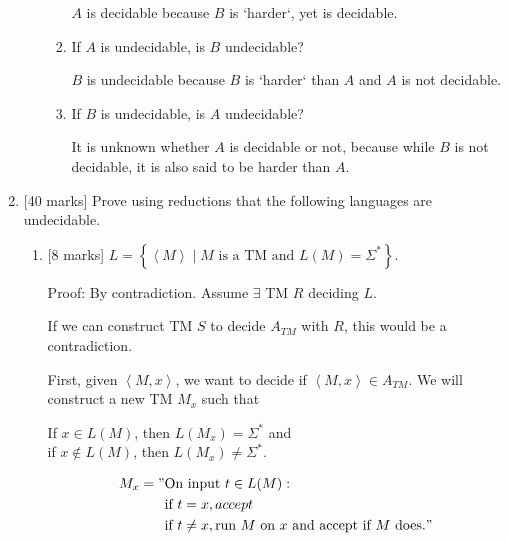 \documentclass{article}
\newcommand{\set}[1]{{\left\{#1\right\}}}    %
\newcommand{\enc}[1]{\left<#1\right>}
\begin{document}
\begin{enumerate}
\begin{enumerate}
\begin{enumerate}
                            $A$ is decidable because $B$ is `harder`, yet is decidable.


                    \item If $A$ is undecidable, is $B$ undecidable?

                            $B$ is undecidable because $B$ is `harder` than $A$ and $A$ is not decidable.

                    \item If $B$ is undecidable, is $A$ undecidable?

                            It is unknown whether $A$ is decidable or not, because while $B$ is not decidable, it is also said to be harder than $A$.
                \end{enumerate}

        \end{enumerate}
    \item {[40 marks]} Prove using reductions that the following languages are undecidable.

    \begin{enumerate}
    		\item {[8 marks]} $L=\set{\enc{M}\mid M\text{ is a TM and }L(M)=\Sigma^*}$.

            		Proof: By contradiction. Assume $\exists$ TM $R$ deciding $L$.

                    If we can construct TM $S$ to decide $A_{TM}$ with $R$, this would be a contradiction.

                    First, given $\enc{M,x}$, we want to decide if $\enc{M,x} \in A_{TM}$. We will construct a new TM $M_x$ such that

                    If $x \in L(M)$, then $L(M_x) = \Sigma^*$ and \\
                    if $x \not\in L(M)$, then $L(M_x) \neq \Sigma^*$.

                    \begin{equation}
                        \begin{split}
                           M_x = "& \text{On input } t \in L(M): \\
                                  & \text{if } t = x, accept\\
                                  & \text{if } t \neq x, \text{run $M$ on $x$ and accept if $M$ does.}"
                        \end{split}
                    \end{equation}


\end{enumerate}
\end{enumerate}
\end{document}
